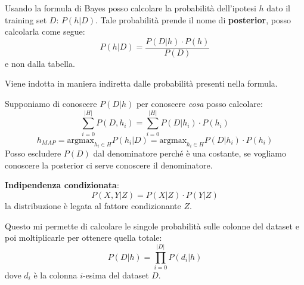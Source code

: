 Usando la formula di Bayes posso calcolare la probabilità dell'ipotesi $h$ dato
il training set $D$: $P(h|D)$. Tale probabilità prende il nome di \textbf{posterior},
posso calcolarla come segue:
\begin{equation}
    P(h|D) = \frac{P(D|h) \cdot P(h)}{P(D)}
\end{equation}
e non dalla tabella.

Viene indotta in maniera indiretta dalle probabilità presenti nella formula.

Supponiamo di conoscere $P(D| h)$ per conoscere \textit{cosa} posso calcolare:
\begin{equation}
    \sum_{i = 0}^{|H|} P(D, h_i) = \sum_{i = 0}^{|H|} P(D|h_i) \cdot P(h_i)
\end{equation}
\begin{equation}
    h_{MAP} = \text{argmax}_{h_i \in H} P(h_i|D) = \text{argmax}_{h_i \in H}
    P(D|h_i) \cdot P(h_i)
\end{equation}
Posso escludere $P(D)$ dal denominatore perché è una costante, se vogliamo
conoscere la posterior ci serve conoscere il denominatore.
\begin{definizione}
    \textbf{Indipendenza condizionata}:
    \begin{equation}
        P(X, Y|Z) = P(X|Z) \cdot P(Y|Z)
    \end{equation}
    la distribuzione è legata al fattore condizionante $Z$.
\end{definizione}
Questo mi permette di calcolare le singole probabilità sulle colonne del dataset
e poi moltiplicarle per ottenere quella totale:
\begin{equation}
    P(D| h) = \prod_{i = 0}^{|D|} P(d_i|h)
\end{equation}
dove $d_i$ è la colonna $i$-esima del dataset $D$.
